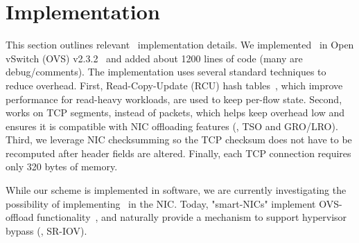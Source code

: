 \section{Implementation}
\label{impl}
This section outlines relevant~\acdc{} implementation details. We
implemented~\acdc{} in Open vSwitch (OVS) v2.3.2~\cite{ovs-website} and
added about 1200 lines of code (many are debug/comments). The implementation uses several standard techniques
to reduce overhead. First, Read-Copy-Update (RCU)
hash tables~\cite{guniguntala2008read}, which improve performance for read-heavy workloads, are used
to keep per-flow state. Second,~\acdc{} works on TCP segments, instead of packets,
which helps keep overhead low and ensures it is compatible with NIC offloading features (\ie{}, TSO and GRO/LRO).
Third, we leverage NIC checksumming so the TCP checksum does not have to be
recomputed after header fields are altered. Finally, each TCP connection requires only 320 bytes
of memory. 


While our scheme is implemented in software, we are currently investigating
the possibility of implementing~\acdc{} in the NIC. Today, "smart-NICs"
implement OVS-offload functionality~\cite{cavium-nic,netronome-nic}, and 
naturally provide a mechanism to support hypervisor bypass (\eg{}, SR-IOV). 


